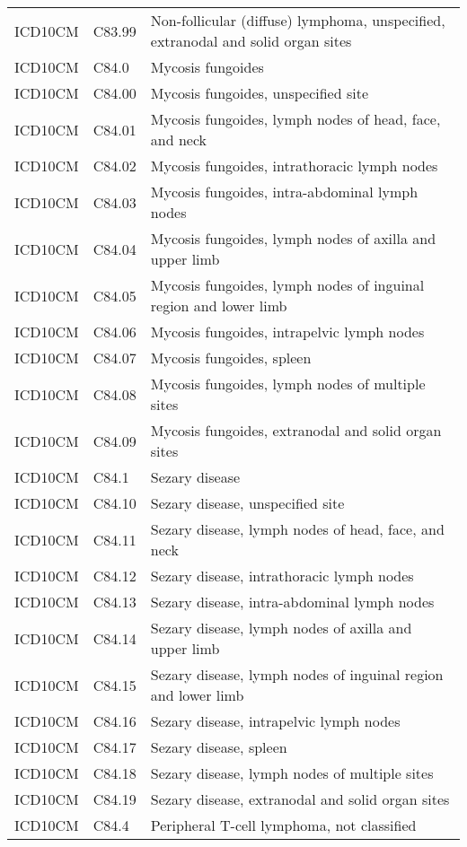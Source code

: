 \begin{table}[ht]
\begin{tabular}{lll}
  ICD10CM & C83.99 & Non-follicular (diffuse) lymphoma, unspecified, extranodal and solid organ sites \\ 
  ICD10CM & C84.0 & Mycosis fungoides \\ 
  ICD10CM & C84.00 & Mycosis fungoides, unspecified site \\ 
  ICD10CM & C84.01 & Mycosis fungoides, lymph nodes of head, face, and neck \\ 
  ICD10CM & C84.02 & Mycosis fungoides, intrathoracic lymph nodes \\ 
  ICD10CM & C84.03 & Mycosis fungoides, intra-abdominal lymph nodes \\ 
  ICD10CM & C84.04 & Mycosis fungoides, lymph nodes of axilla and upper limb \\ 
  ICD10CM & C84.05 & Mycosis fungoides, lymph nodes of inguinal region and lower limb \\ 
  ICD10CM & C84.06 & Mycosis fungoides, intrapelvic lymph nodes \\ 
  ICD10CM & C84.07 & Mycosis fungoides, spleen \\ 
  ICD10CM & C84.08 & Mycosis fungoides, lymph nodes of multiple sites \\ 
  ICD10CM & C84.09 & Mycosis fungoides, extranodal and solid organ sites \\ 
  ICD10CM & C84.1 & Sezary disease \\ 
  ICD10CM & C84.10 & Sezary disease, unspecified site \\ 
  ICD10CM & C84.11 & Sezary disease, lymph nodes of head, face, and neck \\ 
  ICD10CM & C84.12 & Sezary disease, intrathoracic lymph nodes \\ 
  ICD10CM & C84.13 & Sezary disease, intra-abdominal lymph nodes \\ 
  ICD10CM & C84.14 & Sezary disease, lymph nodes of axilla and upper limb \\ 
  ICD10CM & C84.15 & Sezary disease, lymph nodes of inguinal region and lower limb \\ 
  ICD10CM & C84.16 & Sezary disease, intrapelvic lymph nodes \\ 
  ICD10CM & C84.17 & Sezary disease, spleen \\ 
  ICD10CM & C84.18 & Sezary disease, lymph nodes of multiple sites \\ 
  ICD10CM & C84.19 & Sezary disease, extranodal and solid organ sites \\ 
  ICD10CM & C84.4 & Peripheral T-cell lymphoma, not classified \\ 

\end{tabular}
\end{table}
